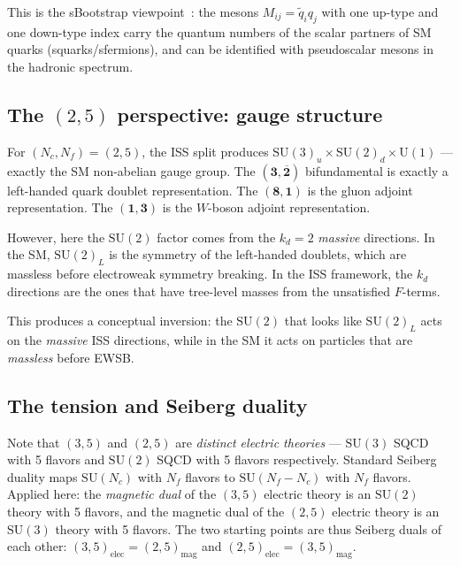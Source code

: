 \documentclass[11pt,a4paper]{article}
\newcommand{\Nf}{N_{\!f}}
\newcommand{\Nc}{N_{\!c}}
\newcommand{\rep}[1]{\mathbf{#1}}
\newcommand{\conjrep}[1]{\overline{\mathbf{#1}}}
\begin{document}
This is the sBootstrap viewpoint~\cite{Rivero2024}: the mesons
$M_{ij} = \tilde q_i q_j$ with one up-type and one down-type index
carry the quantum numbers of the scalar partners of SM quarks
(squarks/sfermions), and can be identified with pseudoscalar mesons in
the hadronic spectrum.

\subsection{The $(2,5)$ perspective: gauge structure}

For $(\Nc,\Nf) = (2,5)$, the ISS split produces
$\mathrm{SU}(3)_u \times \mathrm{SU}(2)_d \times \mathrm{U}(1)$
--- exactly the SM non-abelian gauge group.
The $(\rep{3},\conjrep{2})$ bifundamental is exactly a left-handed
quark doublet representation.
The $(\rep{8},\rep{1})$ is the gluon adjoint representation.
The $(\rep{1},\rep{3})$ is the $W$-boson adjoint representation.

However, here the $\mathrm{SU}(2)$ factor comes from the $k_d = 2$
\emph{massive} directions.  In the SM, $\mathrm{SU}(2)_L$ is the
symmetry of the left-handed doublets, which are massless before
electroweak symmetry breaking.  In the ISS framework, the $k_d$
directions are the ones that have tree-level masses from the
unsatisfied $F$-terms.

This produces a conceptual inversion: the $\mathrm{SU}(2)$ that
looks like $\mathrm{SU}(2)_L$ acts on the
\emph{massive} ISS directions, while in the SM it acts on particles
that are \emph{massless} before EWSB.

\subsection{The tension and Seiberg duality}

Note that $(3,5)$ and $(2,5)$ are \emph{distinct electric theories}
--- $\mathrm{SU}(3)$ SQCD with 5 flavors and $\mathrm{SU}(2)$ SQCD
with 5 flavors respectively.
Standard Seiberg duality maps $\mathrm{SU}(\Nc)$ with $\Nf$ flavors
to $\mathrm{SU}(\Nf-\Nc)$ with $\Nf$ flavors.  Applied here:
the \emph{magnetic dual} of the $(3,5)$ electric theory is an
$\mathrm{SU}(2)$ theory with 5 flavors, and the magnetic dual of
the $(2,5)$ electric theory is an $\mathrm{SU}(3)$ theory with 5
flavors.  The two starting points are thus Seiberg duals of each
other: $(3,5)_{\text{elec}} = (2,5)_{\text{mag}}$ and
$(2,5)_{\text{elec}} = (3,5)_{\text{mag}}$.
\end{document}
